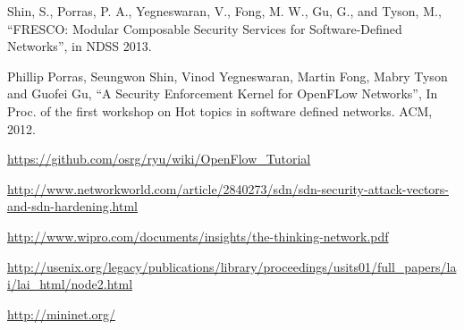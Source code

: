 \begin{thebibliography}{1}
Shin, S., Porras, P. A., Yegneswaran, V., Fong, M. W., Gu, G., and Tyson, M.,
``FRESCO: Modular Composable Security Services for Software-Defined Networks'', in NDSS 2013.

Phillip Porras, Seungwon Shin, Vinod Yegneswaran, Martin Fong, Mabry Tyson and Guofei Gu,
``A Security Enforcement Kernel for OpenFLow Networks'', In Proc. of the first workshop on Hot topics in software defined networks. ACM, 2012.


\url{https://github.com/osrg/ryu/wiki/OpenFlow_Tutorial}

\url{http://www.networkworld.com/article/2840273/sdn/sdn-security-attack-vectors-and-sdn-hardening.html}

\url{http://www.wipro.com/documents/insights/the-thinking-network.pdf}

\url{http://usenix.org/legacy/publications/library/proceedings/usits01/full_papers/lai/lai_html/node2.html}

\url{http://mininet.org/}

\end{thebibliography}